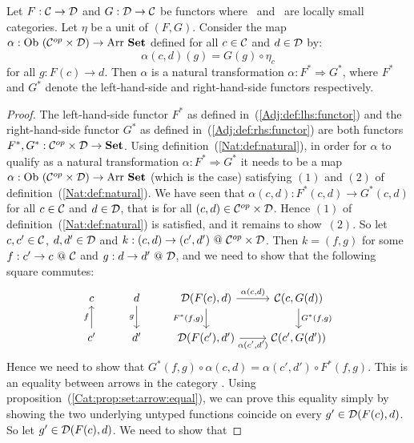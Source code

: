 \begin{prop}\label{Adj:prop:natural:left:right}
    Let $F:\mbox{$\cal C$}\to\mbox{$\cal D$}$ and $G:\mbox{$\cal D$}\to\mbox{$\cal C$}$ be functors where \Cat\ and \Dat\ 
    are locally small categories. Let $\eta$ be a unit of $(F,G)$. Consider the
    map $\alpha:\ob\ (\Cop\times\Dat)\to\arr\ \Set$ defined for all $c\in\mbox{$\cal C$}$ and
    $d\in\mbox{$\cal D$}$ by:
        \[
            \alpha(c,d)(g)=G(g)\circ\eta_{c}
        \]
    for all $g:F(c)\to d$. Then $\alpha$ is a natural transformation 
    $\alpha:F^{*}\Rightarrow G^{*}$, where $F^{*}$ and $G^{*}$ denote
    the left-hand-side and right-hand-side functors respectively.
\end{prop}
\begin{proof}
    The left-hand-side functor $F^{*}$ as defined in~(\ref{Adj:def:lhs:functor})
    and the right-hand-side functor $G^{*}$ as defined 
    in~(\ref{Adj:def:rhs:functor}) are both functors 
    $F^{*},G^{*}:\mbox{${\cal C}^{op}$}\times\mbox{$\cal D$}\to\mbox{\bf Set}$. Using definition~(\ref{Nat:def:natural}),
    in order for $\alpha$ to qualify as a natural transformation 
    $\alpha:F^{*}\Rightarrow G^{*}$ it needs to be a map
    $\alpha:\ob\ (\Cop\times\Dat)\to\arr\ \Set$ (which is the case) satisfying
    $(1)$ and $(2)$ of definition~(\ref{Nat:def:natural}). We have
    seen that $\alpha(c,d):F^{*}(c,d)\to G^{*}(c,d)$ for all $c\in\mbox{$\cal C$}$
    and $d\in\mbox{$\cal D$}$, that is for all $(c,d)\in\mbox{${\cal C}^{op}$}\times\mbox{$\cal D$}$. Hence $(1)$ of
    definition~(\ref{Nat:def:natural}) is satisfied, and it remains to show~$(2)$.
    So let $c,c'\in\mbox{$\cal C$}$, $d,d'\in\mbox{$\cal D$}$ and $k:(c,d)\to(c',d')\ @\ \mbox{${\cal C}^{op}$}\times\mbox{$\cal D$}$.
    Then $k=(f,g)$ for some $f:c'\to c\ @\ \mbox{$\cal C$}$ and $g:d \to d'\ @\ \mbox{$\cal D$}$, and
    we need to show that the following square commutes:
    \[
        \begin{tikzcd}
            c
            &d\arrow[d,swap, "g"]
            &\Dat(F(c),d)\arrow[r, "\alpha\mbox{$(c,d)$}"]
             \arrow[d, swap,"F^{*}\mbox{$(f,g)$}"]
            &\Cat(c,G(d))
             \arrow[d, "G^{*}\mbox{$(f,g)$}"]
            \\
            c'\arrow[u, "f"]
            &d'
            &\Dat(F(c'),d')\arrow[r, swap, "\alpha\mbox{$(c',d')$}"]
            &\Cat(c',G(d'))
        \end{tikzcd}
    \]
    Hence we need to show that $G^{*}(f,g)\circ\alpha(c,d)=\alpha(c',d')\circ
    F^{*}(f,g)$. This is an equality between arrows in the category \Set. Using
    proposition~(\ref{Cat:prop:set:arrow:equal}), we can prove this equality
    simply by showing the two underlying untyped functions coincide on 
    every $g'\in\mbox{$\cal D$}(F(c),d)$. So let $g'\in\mbox{$\cal D$}(F(c),d)$. We need to show that

\end{proof}
